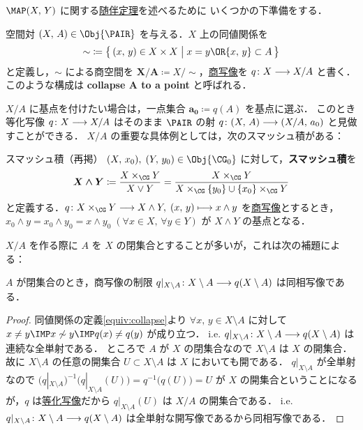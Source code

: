 \documentclass[algtopo_main]{subfiles}
\begin{document}
$\MAP (X,\, Y)$ に関する\hyperref[thm:CG-adjoint]{随伴定理}を述べるために
いくつかの下準備をする．

空間対 $(X,\, A) \in \Obj{\PAIR}$ を与える．$X$ 上の同値関係を
\begin{align}
    \label{equiv:collapse}
    \sim\; \coloneqq \bigl\{\, (x,\, y) \in X \times X \bigm| x=y \OR \{x,\, y\} \subset A \,\bigr\} 
\end{align}
と定義し，$\sim$ による商空間を $\bm{X/A} \coloneqq X/{\sim}$，\hyperref[def:quotient-map]{商写像}を $q \colon X \longrightarrow X/A$ と書く．
このような構成は \textbf{collapse $\bm{A}$ to a point} と呼ばれる．

$X/A$ に基点を付けたい場合は，一点集合 $\bm{a_0} \coloneqq q(A)$ を基点に選ぶ．
このとき等化写像 $q \colon X \longrightarrow X/A$ はそのまま $\PAIR$ の射 $q \colon (X,\, A) \longrightarrow (X/A,\, a_0)$ と見做すことができる．
$X/A$ の重要な具体例としては，次のスマッシュ積がある：

\begin{mydef}[label=def:smash-re]{スマッシュ積（再掲）}
    $(X,\, x_0),\; (Y,\, y_0) \in \Obj{\CG_0}$ に対して，\textbf{スマッシュ積}を
    \begin{align}
        \bm{X \wedge Y} \coloneqq \frac{X \times_{\CG} Y}{X \vee Y} = \frac{X \times_{\CG} Y}{X \times_{\CG} \{y_0\} \cup \{x_0\} \times_{\CG} Y}
    \end{align}
    と定義する．$q \colon X \times_{\CG} Y \lto X \wedge Y,\; (x,\, y) \lmto x \wedge y$ を\hyperref[def:quotient-map]{商写像}とするとき，
    $x_0 \wedge y = x_0 \wedge y_0 = x \wedge y_0\; (\forall x \in X,\, \forall y \in Y)$ が $X \wedge Y$ の基点となる．
\end{mydef}

$X/A$ を作る際に $A$ を $X$ の閉集合とすることが多いが，これは次の補題による：
\begin{mylem}[label=lem:collapse]{}
    $A$ が閉集合のとき，商写像の制限 $q|_{X\setminus A} \colon X \setminus A \longrightarrow q(X \setminus A)$ は同相写像である．
\end{mylem}

\begin{proof}
    同値関係の定義\eqref{equiv:collapse}より $\forall x,\,y \in X \setminus A$ に対して $x \neq y \IMP x \not\sim y \IMP q(x) \neq q(y)$ が成り立つ．
    i.e. $q|_{X\setminus A} \colon X \setminus A \longrightarrow q(X \setminus A)$ は連続な全単射である．
    ところで $A$ が $X$ の閉集合なので $X \setminus A$ は $X$ の開集合．故に $X\setminus A$ の任意の開集合 $U \subset X \setminus A$ は $X$ においても開である．
    $q|_{X\setminus A}$ が全単射なので $(q|_{X\setminus A})^{-1} \bigl( q|_{X\setminus A}(U) \bigr) = q^{-1} \bigl( q(U) \bigr) = U$ が $X$ の開集合ということになるが，$q$ は\hyperref[def:quotient-map]{等化写像}だから $q|_{X\setminus A}(U)$ は $X/A$ の開集合である．
    i.e. $q|_{X\setminus A} \colon X \setminus A \longrightarrow q(X \setminus A)$ は全単射な開写像であるから同相写像である．
\end{proof}
\end{document}
